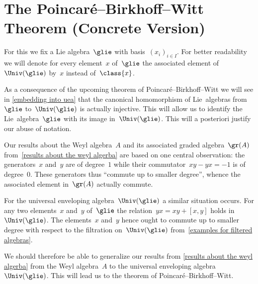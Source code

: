 \section{The Poincaré--Birkhoff--Witt Theorem (Concrete Version)}
\label{section for concrete pbw}


\begin{convention}
	For this  we fix a Lie algebra~$\glie$ with basis~$(x_i)_{i \in I}$.
	For better readability we will denote for every element~$x$ of~$\glie$ the associated element of~$\Univ(\glie)$ by~$x$ instead of~$\class{x}$.
\end{convention}


\begin{remark}
	As a consequence of the upcoming theorem of Poincaré--Birkhoff--Witt we will see in \cref{embedding into uea} that the canonical homomorphism of Lie~algebras from~$\glie$ to~$\Univ(\glie)$ is actually injective.
	This will allow us to identify the Lie~algebra~$\glie$ with its image in~$\Univ(\glie)$.
	This will a posteriori justify our abuse of notation.
\end{remark}


\begin{fluff}
	Our results about the Weyl algebra~$A$ and its associated graded algebra~$\gr(A)$ from~\cref{results about the weyl algerba} are based on one central observation:
	the generators~$x$ and~$y$ are of degree~$1$ while their commutator~$xy - yx = -1$ is of degree~$0$.
	These generators thus \enquote{commute up to smaller degree}, whence the associated element in~$\gr(A)$ actually commute.
	
	For the universal enveloping algebra~$\Univ(\glie)$ a similar situation occurs.
	For any two elements~$x$ and~$y$ of~$\glie$ the relation~$yx = xy + [x,y]$ holds in~$\Univ(\glie)$.
	The elements~$x$ and~$y$ hence ought to commute up to smaller degree with respect to the filtration on~$\Univ(\glie)$ from~\cref{examples for filtered algebras}.

	We should therefore be able to generalize our results from \cref{results about the weyl algerba} from the Weyl algebra~$A$ to the universal enveloping algebra~$\Univ(\glie)$.
	This will lead us to the theorem of Poincaré--Birkhoff--Witt.
\end{fluff}




